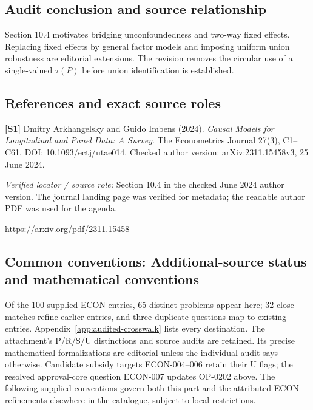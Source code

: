 \documentclass[11pt,a4paper]{article}
\begin{document}
\subsection*{Audit conclusion and source relationship}

Section 10.4 motivates bridging unconfoundedness and two-way fixed effects. Replacing fixed effects by general factor models and imposing uniform union robustness are editorial extensions. The revision removes the circular use of a single-valued $\tau(P)$ before union identification is established.

\subsection*{References and exact source roles}

{\footnotesize\raggedright
\par\noindent\textbf{[S1]} Dmitry Arkhangelsky and Guido Imbens (2024). \emph{Causal Models for Longitudinal and Panel Data: A Survey}. The Econometrics Journal 27(3), C1--C61, DOI: 10.1093/ectj/utae014. Checked author version: arXiv:2311.15458v3, 25 June 2024.\par \textit{Verified locator / source role:} Section 10.4 in the checked June 2024 author version. The journal landing page was verified for metadata; the readable author PDF was used for the agenda.\par \url{https://arxiv.org/pdf/2311.15458}\par\smallskip
}

\subsection*{Common conventions: Additional-source status and mathematical conventions}

\label{audited:conventions}

Of the 100 supplied ECON entries, 65 distinct problems appear here; 32 close
matches refine earlier entries, and three duplicate questions map to existing
entries. Appendix~\ref{app:audited-crosswalk} lists every destination.
The attachment's P/R/S/U distinctions and source audits are retained. Its
precise mathematical formalizations are editorial unless the individual audit
says otherwise. Candidate subsidy targets ECON-004--006 retain their U flags;
the resolved approval-core question ECON-007 updates OP-0202 above.
The following supplied conventions govern both this part and the attributed
ECON refinements elsewhere in the catalogue, subject to local restrictions.
\end{document}
